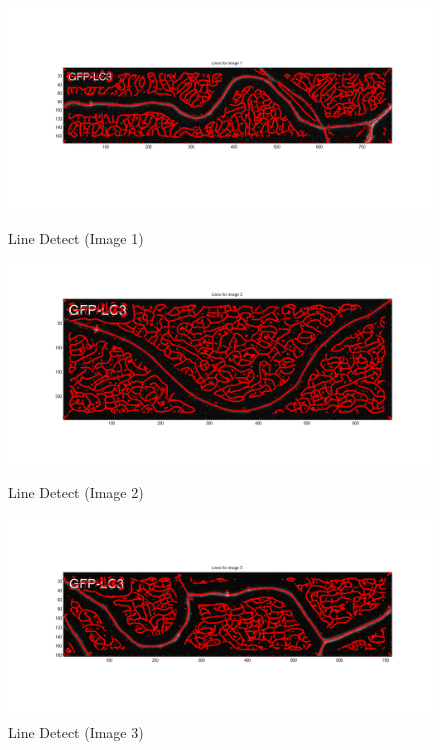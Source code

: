\documentclass{article}
\begin{document}
\begin{figure}[h]
\begin{minipage}[b]{0.3\linewidth}
\centering
\includegraphics[width=\textwidth]{figures/line_detection_1.png}
\caption{Line Detect (Image 1)}
\label{fig:line_detect_1}
\end{minipage}
\hspace{0.5cm}
\begin{minipage}[b]{0.3\linewidth}
\centering
\includegraphics[width=\textwidth]{figures/line_detection_2.png}
\caption{Line Detect (Image 2)}
\label{fig:line_detect_2}
\end{minipage}
\begin{minipage}[b]{0.3\linewidth}
\centering
\includegraphics[width=\textwidth]{figures/line_detection_3.png}
\caption{Line Detect (Image 3)}
\label{fig:line_detect_3}
\end{minipage}
\end{figure}
\end{document}
